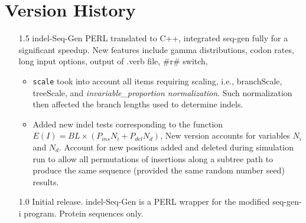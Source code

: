 \documentclass[10pt]{article}
\begin{document}
\newpage
\section{Version History}
\begin{itemize}
\item[1.5] indel-Seq-Gen PERL translated to C++, integrated seq-gen fully for a significant speedup.
New features include gamma distributions, codon rates, long input options, output of .verb file,
\#r\# switch,
  \begin{itemize}
  \item {\tt scale} took into account all items requiring scaling, i.e., branchScale, treeScale, and
    \emph{invariable_proportion normalization}. Such normalization then affected the branch lengths
    used to determine indels.
  \item Added new indel tests corresponding to the function $E(I)=BL\times(P_{ins}N_i+P_{del}N_d)$,
    New version accounts for variables $N_i$ and $N_d$. Account for new positions added and deleted
    during simulation run to allow all permutations of insertions along a subtree path to produce
    the same sequence (provided the same random number seed) results.
  \end{itemize}
\item[1.0] Initial release. indel-Seq-Gen is a PERL wrapper for the modified seq-gen-i program.
Protein sequences only.
\end{itemize}
\newpage


\end{document}
